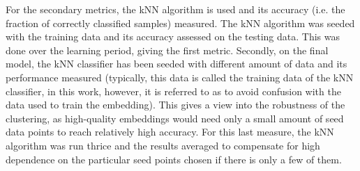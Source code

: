 For the secondary metrics, the kNN algorithm is used and its accuracy (i.e. the fraction of correctly classified samples) measured. The kNN algorithm was seeded with the training data and its accuracy assessed on the testing data. This was done over the learning period, giving the first metric. Secondly, on the final model, the kNN classifier has been seeded with different amount of data and its performance measured (typically, this data is called the training data of the kNN classifier, in this work, however, it is referred to as  to avoid confusion with the data used to train the embedding). This gives a view into the robustness of the clustering, as high-quality embeddings would need only a small amount of seed data points to reach relatively high accuracy. For this last measure, the kNN algorithm was run thrice and the results averaged to compensate for high dependence on the particular seed points chosen if there is only a few of them.
